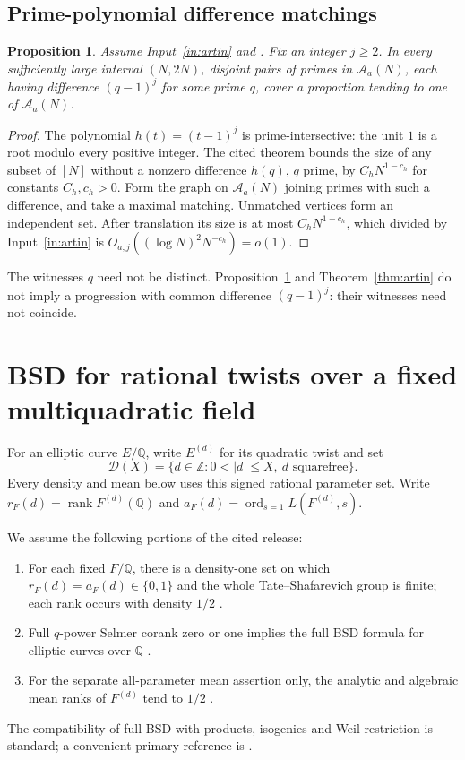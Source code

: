 \documentclass[11pt]{article}
\newtheorem{proposition}[theorem]{Proposition}
\theoremstyle{definition}
\theoremstyle{remark}
\newcommand{\Q}{\mathbb Q}
\newcommand{\Z}{\mathbb Z}
\DeclareMathOperator{\rank}{rank}
\DeclareMathOperator{\ord}{ord}
\begin{document}
\subsection{Prime-polynomial difference matchings}
\begin{proposition}\label{prop:matching}
Assume Input~\ref{in:artin} and \cite[Theorem 1.1, p.~1]{polydiff}. Fix an integer $j\ge2$. In every sufficiently large interval $(N,2N)$, disjoint pairs of primes in $\mathcal A_a(N)$, each having difference $(q-1)^j$ for some prime $q$, cover a proportion tending to one of $\mathcal A_a(N)$.
\end{proposition}
\begin{proof}
The polynomial $h(t)=(t-1)^j$ is prime-intersective: the unit $1$ is a root modulo every positive integer. The cited theorem bounds the size of any subset of $[N]$ without a nonzero difference $h(q)$, $q$ prime, by $C_hN^{1-c_h}$ for constants $C_h,c_h>0$. Form the graph on $\mathcal A_a(N)$ joining primes with such a difference, and take a maximal matching. Unmatched vertices form an independent set. After translation its size is at most $C_hN^{1-c_h}$, which divided by Input~\ref{in:artin} is $O_{a,j}((\log N)^2N^{-c_h})=o(1)$.
\end{proof}
The witnesses $q$ need not be distinct. Proposition~\ref{prop:matching} and Theorem~\ref{thm:artin} do not imply a progression with common difference $(q-1)^j$: their witnesses need not coincide.

\section{BSD for rational twists over a fixed multiquadratic field}
For an elliptic curve $E/\Q$, write $E^{(d)}$ for its quadratic twist and set
\[
\mathcal D(X)=\{d\in\Z:0<|d|\le X,\ d\text{ squarefree}\}.
\]
Every density and mean below uses this signed rational parameter set. Write $r_F(d)=\rank F^{(d)}(\Q)$ and $a_F(d)=\ord_{s=1}L(F^{(d)},s)$.

We assume the following portions of the cited release:
\begin{enumerate}[label=(\roman*)]
\item For each fixed $F/\Q$, there is a density-one set on which $r_F(d)=a_F(d)\in\{0,1\}$ and the whole Tate--Shafarevich group is finite; each rank occurs with density $1/2$ \cite[Theorems 1.1--1.2, p.~2]{density}.
\item Full $q$-power Selmer corank zero or one implies the full BSD formula for elliptic curves over $\Q$ \cite[Theorem 1.1, p.~3]{bsd}.
\item For the separate all-parameter mean assertion only, the analytic and algebraic mean ranks of $F^{(d)}$ tend to $1/2$ \cite[Theorem 1.1 and Corollary 1.3, pp.~1--2]{mean}.
\end{enumerate}
The compatibility of full BSD with products, isogenies and Weil restriction is standard; a convenient primary reference is \cite[Proposition 6]{vanbommel}.
\end{document}
